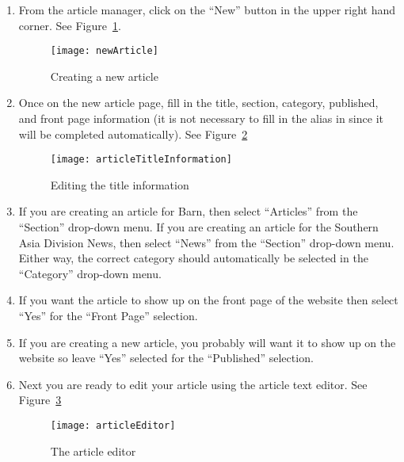 \documentclass{howto}
\begin{document}
\begin{enumerate}
\item{From the article manager, click on the “New” button in the upper right hand corner. See Figure~\ref{newArticle}.}

  \begin{figure}[h]
    \begin{center}
      \texttt{[image: newArticle]}
    \end{center}
    \caption{Creating a new article}
    \label{newArticle}
  \end{figure}

\item{Once on the new article page, fill in the title, section, category, published, and front page information (it is not necessary to fill in the alias in since it will be completed automatically).  See Figure~\ref{titleInfo}}

  \begin{figure}[h]
    \begin{center}
      \texttt{[image: articleTitleInformation]}
    \end{center}
    \caption{Editing the title information}
    \label{titleInfo}
  \end{figure}

\item{If you are creating an article for Barn, then select “Articles” from the “Section” drop-down menu.  If you are creating an article for the Southern Asia Division News, then select “News” from the “Section” drop-down menu.  Either way, the correct category should automatically be selected in the “Category” drop-down menu.}

\item{If you want the article to show up on the front page of the website then select “Yes” for the “Front Page” selection.}

\item{If you are creating a new article, you probably will want it to show up on the website so leave “Yes” selected for the “Published” selection.}

\item{Next you are ready to edit your article using the article text editor.  See Figure~\ref{editor}}

  \begin{figure}[h]
    \begin{center}
      \texttt{[image: articleEditor]}
    \end{center}
    \caption{The article editor}
    \label{editor}
  \end{figure}


\end{enumerate}
\end{document}
